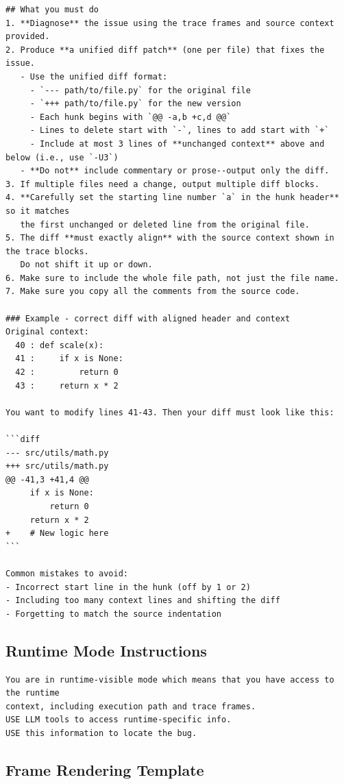 \begin{Verbatim}[fontsize=\small]
## What you must do
1. **Diagnose** the issue using the trace frames and source context provided.
2. Produce **a unified diff patch** (one per file) that fixes the issue.
   - Use the unified diff format:
     - `--- path/to/file.py` for the original file
     - `+++ path/to/file.py` for the new version
     - Each hunk begins with `@@ -a,b +c,d @@`
     - Lines to delete start with `-`, lines to add start with `+`
     - Include at most 3 lines of **unchanged context** above and below (i.e., use `-U3`)
   - **Do not** include commentary or prose--output only the diff.
3. If multiple files need a change, output multiple diff blocks.
4. **Carefully set the starting line number `a` in the hunk header** so it matches
   the first unchanged or deleted line from the original file.
5. The diff **must exactly align** with the source context shown in the trace blocks.
   Do not shift it up or down.
6. Make sure to include the whole file path, not just the file name.
7. Make sure you copy all the comments from the source code.

### Example - correct diff with aligned header and context
Original context:
  40 : def scale(x):
  41 :     if x is None:
  42 :         return 0
  43 :     return x * 2

You want to modify lines 41-43. Then your diff must look like this:

```diff
--- src/utils/math.py
+++ src/utils/math.py
@@ -41,3 +41,4 @@
     if x is None:
         return 0
     return x * 2
+    # New logic here
```

Common mistakes to avoid:
- Incorrect start line in the hunk (off by 1 or 2)
- Including too many context lines and shifting the diff
- Forgetting to match the source indentation
\end{Verbatim}

\subsection{Runtime Mode Instructions}
\label{subsec:prompt-runtime}

\begin{Verbatim}[fontsize=\small]
You are in runtime-visible mode which means that you have access to the runtime
context, including execution path and trace frames. 
USE LLM tools to access runtime-specific info.
USE this information to locate the bug.
\end{Verbatim}

\subsection{Frame Rendering Template}
\label{subsec:prompt-frame-template}

